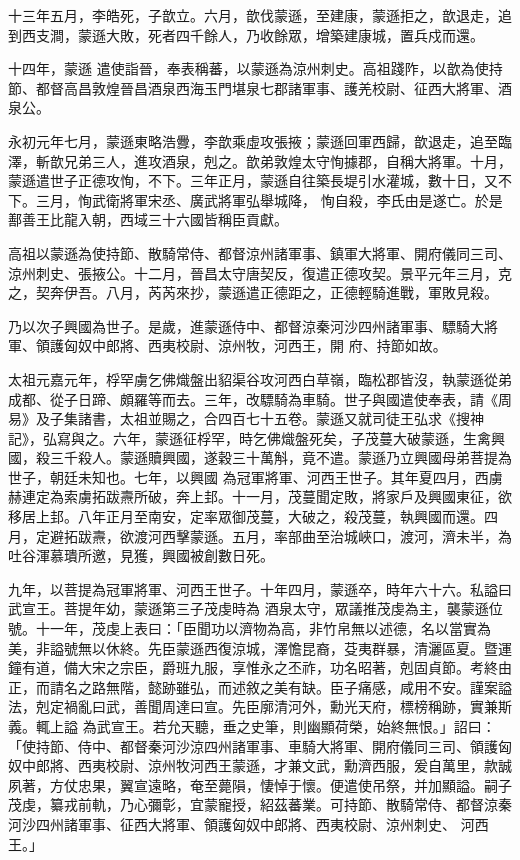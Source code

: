 \begin{pinyinscope}
 十三年五月，李皓死，子歆立。六月，歆伐蒙遜，至建康，蒙遜拒之，歆退走，追到西支澗，蒙遜大敗，死者四千餘人，乃收餘眾，增築建康城，置兵戍而還。



 十四年，蒙遜
 遣使詣晉，奉表稱蕃，以蒙遜為涼州刺史。高祖踐阼，以歆為使持節、都督高昌敦煌晉昌酒泉西海玉門堪泉七郡諸軍事、護羌校尉、征西大將軍、酒泉公。



 永初元年七月，蒙遜東略浩釁，李歆乘虛攻張掖；蒙遜回軍西歸，歆退走，追至臨澤，斬歆兄弟三人，進攻酒泉，剋之。歆弟敦煌太守恂據郡，自稱大將軍。十月，蒙遜遣世子正德攻恂，不下。三年正月，蒙遜自往築長堤引水灌城，數十日，又不下。三月，恂武衛將軍宋丞、廣武將軍弘舉城降，
 恂自殺，李氏由是遂亡。於是鄯善王比龍入朝，西域三十六國皆稱臣貢獻。



 高祖以蒙遜為使持節、散騎常侍、都督涼州諸軍事、鎮軍大將軍、開府儀同三司、涼州刺史、張掖公。十二月，晉昌太守唐契反，復遣正德攻契。景平元年三月，克之，契奔伊吾。八月，芮芮來抄，蒙遜遣正德距之，正德輕騎進戰，軍敗見殺。



 乃以次子興國為世子。是歲，進蒙遜侍中、都督涼秦河沙四州諸軍事、驃騎大將軍、領護匈奴中郎將、西夷校尉、涼州牧，河西王，開
 府、持節如故。



 太祖元嘉元年，桴罕虜乞佛熾盤出貂渠谷攻河西白草嶺，臨松郡皆沒，執蒙遜從弟成都、從子日蹄、頗羅等而去。三年，改驃騎為車騎。世子與國遣使奉表，請《周易》及子集諸書，太祖並賜之，合四百七十五卷。蒙遜又就司徒王弘求《搜神記》，弘寫與之。六年，蒙遜征桴罕，時乞佛熾盤死矣，子茂蔓大破蒙遜，生禽興國，殺三千殺人。蒙遜贖興國，遂穀三十萬斛，竟不遣。蒙遜乃立興國母弟菩提為世子，朝廷未知也。七年，以興國
 為冠軍將軍、河西王世子。其年夏四月，西虜赫連定為索虜拓跋燾所破，奔上邽。十一月，茂蔓聞定敗，將家戶及興國東征，欲移居上邽。八年正月至南安，定率眾御茂蔓，大破之，殺茂蔓，執興國而還。四月，定避拓跋燾，欲渡河西擊蒙遜。五月，率部曲至治城峽口，渡河，濟未半，為吐谷渾慕璝所邀，見獲，興國被創數日死。



 九年，以菩提為冠軍將軍、河西王世子。十年四月，蒙遜卒，時年六十六。私謚曰武宣王。菩提年幼，蒙遜第三子茂虔時為
 酒泉太守，眾議推茂虔為主，襲蒙遜位號。十一年，茂虔上表曰：「臣聞功以濟物為高，非竹帛無以述德，名以當實為美，非謚號無以休終。先臣蒙遜西復涼城，澤憺昆裔，芟夷群暴，清灑區夏。暨運鐘有道，備大宋之宗臣，爵班九服，享惟永之丕祚，功名昭著，剋固貞節。考終由正，而請名之路無階，懿跡雖弘，而述敘之美有缺。臣子痛感，咸用不安。謹案謚法，剋定禍亂曰武，善聞周達曰宣。先臣廓清河外，勳光天府，標榜稱跡，實兼斯義。輒上謚
 為武宣王。若允天聽，垂之史筆，則幽顯荷榮，始終無恨。」詔曰：「使持節、侍中、都督秦河沙涼四州諸軍事、車騎大將軍、開府儀同三司、領護匈奴中郎將、西夷校尉、涼州牧河西王蒙遜，才兼文武，勳濟西服，爰自萬里，款誠夙著，方仗忠果，翼宣遠略，奄至薨隕，悽悼于懷。便遣使吊祭，并加顯謚。嗣子茂虔，纂戎前軌，乃心彌彰，宜蒙寵授，紹茲蕃業。可持節、散騎常侍、都督涼秦河沙四州諸軍事、征西大將軍、領護匈奴中郎將、西夷校尉、涼州刺史、
 河西王。」




\end{pinyinscope}
